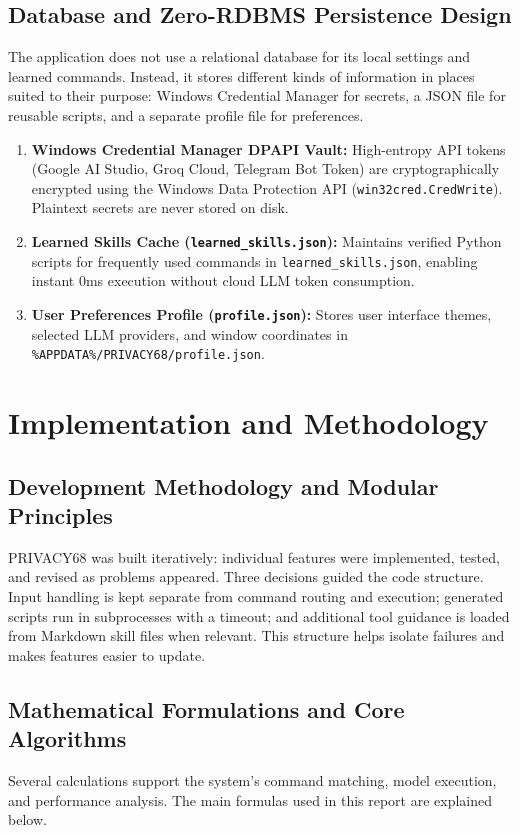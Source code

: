 \documentclass[12pt,letterpaper,oneside]{report}
\begin{document}
\section{Database and Zero-RDBMS Persistence Design}
The application does not use a relational database for its local settings and learned commands. Instead, it stores different kinds of information in places suited to their purpose: Windows Credential Manager for secrets, a JSON file for reusable scripts, and a separate profile file for preferences.
\begin{enumerate}
    \item \textbf{Windows Credential Manager DPAPI Vault:} High-entropy API tokens (Google AI Studio, Groq Cloud, Telegram Bot Token) are cryptographically encrypted using the Windows Data Protection API (\texttt{win32cred.CredWrite}). Plaintext secrets are never stored on disk.
    \item \textbf{Learned Skills Cache (\texttt{learned\_skills.json}):} Maintains verified Python scripts for frequently used commands in \texttt{learned\_skills.json}, enabling instant 0ms execution without cloud LLM token consumption.
    \item \textbf{User Preferences Profile (\texttt{profile.json}):} Stores user interface themes, selected LLM providers, and window coordinates in \texttt{\%APPDATA\%/PRIVACY68/profile.json}.
\end{enumerate}

\chapter{Implementation and Methodology}
\section{Development Methodology and Modular Principles}
PRIVACY68 was built iteratively: individual features were implemented, tested, and revised as problems appeared. Three decisions guided the code structure. Input handling is kept separate from command routing and execution; generated scripts run in subprocesses with a timeout; and additional tool guidance is loaded from Markdown skill files when relevant. This structure helps isolate failures and makes features easier to update.

\section{Mathematical Formulations and Core Algorithms}
Several calculations support the system's command matching, model execution, and performance analysis. The main formulas used in this report are explained below.
\end{document}
